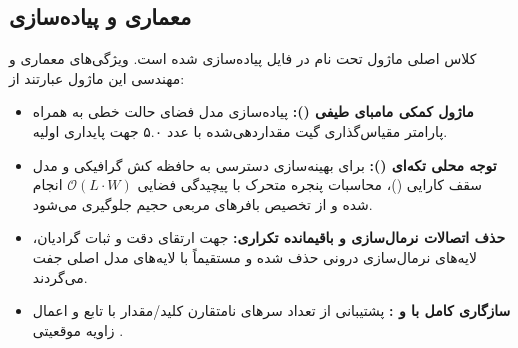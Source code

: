 \subsection{معماری و پیاده‌سازی}
کلاس اصلی ماژول تحت نام  در فایل  پیاده‌سازی شده است. ویژگی‌های معماری و مهندسی این ماژول عبارتند از:
\begin{itemize}
    \item \textbf{ماژول کمکی مامبای طیفی ():} پیاده‌سازی مدل فضای حالت خطی به همراه پارامتر مقیاس‌گذاری گیت  مقداردهی‌شده با عدد ۵.۰ جهت پایداری اولیه.
    \item \textbf{توجه محلی تکه‌ای ():} برای بهینه‌سازی دسترسی به حافظه کش گرافیکی و مدل سقف کارایی ()، محاسبات پنجره متحرک با پیچیدگی فضایی $\mathcal{O}(L \cdot W)$ انجام شده و از تخصیص بافرهای مربعی حجیم جلوگیری می‌شود.
    \item \textbf{حذف اتصالات نرمال‌سازی و باقیمانده تکراری:} جهت ارتقای دقت و ثبات گرادیان، لایه‌های نرمال‌سازی درونی حذف شده و مستقیماً با لایه‌های مدل اصلی جفت می‌گردند.
    \item \textbf{سازگاری کامل با  و :} پشتیبانی از تعداد سرهای نامتقارن کلید/مقدار با تابع  و اعمال زاویه موقعیتی .
\end{itemize}
